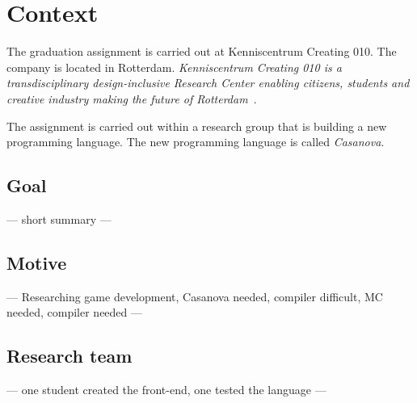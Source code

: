 \section{Context}
The graduation assignment is carried out at Kenniscentrum Creating 010.
The company is located in Rotterdam.
\textit{Kenniscentrum Creating 010 is a transdisciplinary design-inclusive Research Center enabling citizens, students and creative industry making the future of Rotterdam}~\cite{creating2016home}.

The assignment is carried out within a research group that is building a new programming language.
The new programming language is called \emph{Casanova}.

\subsection{Goal}
--- short summary ---

\subsection{Motive}\label{motive}
--- Researching game development, Casanova needed, compiler difficult, MC needed, compiler needed ---

\subsection{Research team}
--- one student created the front-end, one tested the language ---

